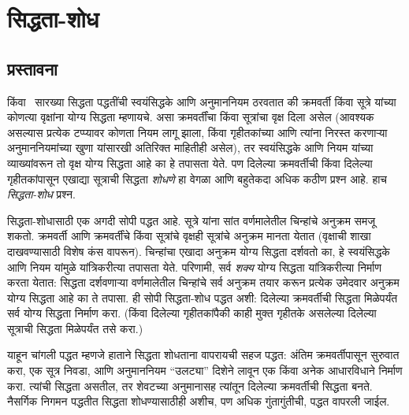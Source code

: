 \chapter{सिद्धता-शोध}\label{pt:ps:chap}










\section{प्रस्तावना}\label{pt:ps:int:sec}

 किंवा~ सारख्या सिद्धता
पद्धतींची स्वयंसिद्धके आणि अनुमाननियम ठरवतात की
क्रमवर्ती किंवा सूत्रे यांच्या कोणत्या वृक्षांना
योग्य सिद्धता म्हणायचे. असा क्रमवर्तींचा किंवा
सूत्रांचा वृक्ष दिला असेल (आवश्यक असल्यास
प्रत्येक टप्प्यावर कोणता नियम लागू झाला, किंवा
गृहीतकांच्या आणि त्यांना निरस्त करणाऱ्या अनुमाननियमांच्या
खुणा यांसारखी अतिरिक्त माहितीही असेल), तर
स्वयंसिद्धके आणि नियम यांच्या व्याख्यांवरून तो
वृक्ष योग्य सिद्धता आहे का हे तपासता येते.
पण दिलेल्या क्रमवर्तीची किंवा दिलेल्या गृहीतकांपासून
एखाद्या सूत्राची सिद्धता \emph{शोधणे}
हा वेगळा आणि बहुतेकदा अधिक कठीण प्रश्न आहे.
हाच \emph{सिद्धता-शोध} प्रश्न.

सिद्धता-शोधासाठी एक अगदी सोपी पद्धत आहे.
सूत्रे यांना सांत वर्णमालेतील चिन्हांचे अनुक्रम
समजू शकतो. क्रमवर्ती आणि क्रमवर्तींचे किंवा
सूत्रांचे वृक्षही सूत्रांचे अनुक्रम
मानता येतात (वृक्षाची शाखा दाखवण्यासाठी विशेष
कंस वापरून). चिन्हांचा एखादा अनुक्रम योग्य सिद्धता
दर्शवतो का, हे स्वयंसिद्धके आणि नियम यांमुळे
यांत्रिकरीत्या तपासता येते. परिणामी, सर्व \emph{शक्य}
योग्य सिद्धता यांत्रिकरीत्या निर्माण करता येतात:
सिद्धता दर्शवणाऱ्या वर्णमालेतील चिन्हांचे सर्व
अनुक्रम तयार करून प्रत्येक उमेदवार अनुक्रम योग्य
सिद्धता आहे का ते तपासा. ही सोपी सिद्धता-शोध
पद्धत अशी: दिलेल्या क्रमवर्तीची सिद्धता मिळेपर्यंत
सर्व योग्य सिद्धता निर्माण करा. (किंवा दिलेल्या
गृहीतकांपैकी काही मुक्त गृहीतके असलेल्या दिलेल्या
सूत्राची सिद्धता मिळेपर्यंत तसे करा.)

याहून चांगली पद्धत म्हणजे हाताने सिद्धता
शोधताना वापरायची सहज पद्धत: अंतिम क्रमवर्तीपासून
सुरुवात करा, एक सूत्र निवडा, आणि अनुमाननियम
``उलट्या'' दिशेने लावून एक किंवा अनेक आधारविधाने
निर्माण करा. त्यांची सिद्धता असतील, तर शेवटच्या
अनुमानासह त्यांतून दिलेल्या क्रमवर्तीची सिद्धता
बनते. नैसर्गिक निगमन पद्धतीत सिद्धता
शोधण्यासाठीही अशीच, पण अधिक गुंतागुंतीची, पद्धत
वापरली जाईल.

